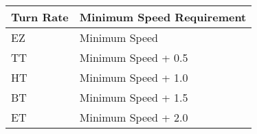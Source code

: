 
\begin{onecolumntablefloat}
\begin{onecolumntable}
\begin{tabular}{ll}
\toprule
Turn Rate&Minimum Speed Requirement\\
\midrule
 EZ& Minimum Speed\\
 TT& Minimum Speed + 0.5\\
 HT& Minimum Speed + 1.0\\
 BT& Minimum Speed + 1.5\\ 
 ET& Minimum Speed + 2.0\\
\bottomrule
\end{tabular}
\end{onecolumntable}
\end{onecolumntablefloat}
